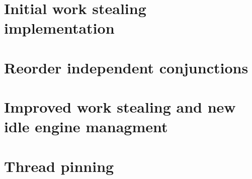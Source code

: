 

\section{Initial work stealing implementation}
\label{sec:rts_work_stealing}



\section{Reorder independent conjunctions}
\label{sec:rts_reorder}



\section{Improved work stealing and new idle engine managment}
\label{sec:rts_work_stealing2}



\section{Thread pinning}
\label{sec:rts_thread_pinning}



%

